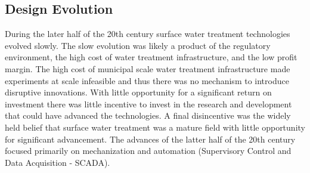 \documentclass[letterpaper,10pt,english]{sphinxmanual}
\begin{document}
\begin{description}
%
\begin{sphinxVerbatim}[commandchars=\\\{\}]
  
  
      
  
  
  
  
\end{sphinxVerbatim}

\end{description}


\subsection{Design Evolution}
\label{\detokenize{Introduction/Introduction:design-evolution}}
During the later half of the 20th century surface water treatment technologies evolved slowly. The slow evolution was likely a product of the regulatory environment, the high cost of water treatment infrastructure, and the low profit margin. The high cost of municipal scale water treatment infrastructure made experiments at scale infeasible and thus there was no mechanism to introduce disruptive innovations. With little opportunity for a significant return on investment there was little incentive to invest in the research and development that could have advanced the technologies. A final disincentive was the widely held belief that surface water treatment was a mature field with little opportunity for significant advancement. The advances of the latter half of the 20th century focused primarily on mechanization and automation (Supervisory Control and Data Acquisition - SCADA).
\end{document}
